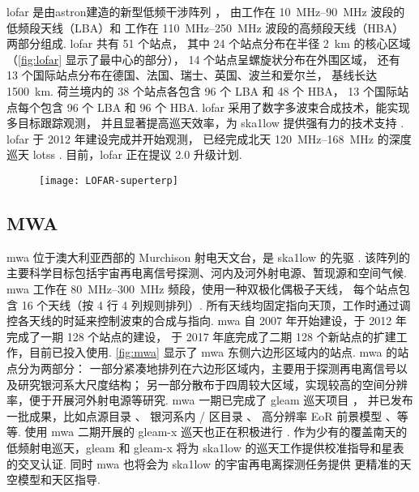 \acf{lofar} 是由\ac{astron}建造的新型低频干涉阵列 \cite{vanHaarlem2013}，
由工作在 \SIrange{10}{90}{\MHz} 波段的低频段天线（LBA）和
工作在 \SIrange{110}{250}{\MHz} 波段的高频段天线（HBA）两部分组成.
\acs{lofar} 共有 51 个站点，
其中 24 个站点分布在半径 \SI{2}{\km} 的核心区域
（\autoref{fig:lofar} 显示了最中心的部分），
14 个站点呈螺旋状分布在外围区域，
还有 13 个国际站点分布在德国、法国、瑞士、英国、波兰和爱尔兰，
基线长达 \SI{1500}{\km}.
荷兰境内的 38 个站点各包含 96 个 LBA 和 48 个 HBA，
13 个国际站点每个包含 96 个 LBA 和 96 个 HBA.
\acs{lofar} 采用了数字多波束合成技术，能实现多目标跟踪观测，
并且显著提高巡天效率，为 \acs{ska1low} 提供强有力的技术支持
\cite{deVos2009,vanHaarlem2013,pizzo2018}.
\acs{lofar} 于 2012 年建设完成并开始观测，
已经完成北天 \SIrange{120}{168}{\MHz} 的深度巡天
\ac{lotss} \cite{shimwell2017,shimwell2019}.
目前，\acs{lofar} 正在提议 2.0 升级计划.

\begin{figure}
  \centering
  \texttt{[image: LOFAR-superterp]}
  \label{fig:lofar}
\end{figure}

\subsection{MWA}

\acf{mwa} 位于澳大利亚西部的 Murchison 射电天文台，是 \acs{ska1low} 的先驱
\cite{lonsdale2009,bowman2013,tingay2013,wayth2018}.
该阵列的主要科学目标包括宇宙再电离信号探测、河内及河外射电源、暂现源和空间气候.
\acs{mwa} 工作在 \SIrange{80}{300}{\MHz} 频段，使用一种双极化偶极子天线，
每个站点包含 16 个天线（按 4 行 4 列规则排列）.
所有天线均固定指向天顶，工作时通过调控各天线的时延来控制波束的合成与指向.
\acs{mwa} 自 2007 年开始建设，于 2012 年完成了一期 128 个站点的建设，
于 2017 年底完成了二期 128 个新站点的扩建工作\cite{wayth2018}，目前已投入使用.
\autoref{fig:mwa} 显示了 \acs{mwa} 东侧六边形区域内的站点.
\acs{mwa} 的站点分为两部分：
一部分紧凑地排列在六边形区域内，主要用于探测再电离信号以及研究银河系大尺度结构；
另一部分散布于四周较大区域，实现较高的空间分辨率，便于开展河外射电源等研究.
\acs{mwa} 一期已完成了 \ac{gleam} 巡天项目 \cite{wayth2015}，
并已发布一批成果，比如点源目录 \cite{hurleyWalker2017}、
银河系内 \Hii/ 区目录 \cite{su2018}、
高分辨率 EoR 前景模型 \cite{procopio2017}、等等.
使用 \acs{mwa} 二期开展的 \ac{gleam-x} 巡天也正在积极进行 \cite{hurleyWalker2017prop}.
作为少有的覆盖南天的低频射电巡天，\acs{gleam} 和 \acs{gleam-x}
将为 \acs{ska1low} 的巡天工作提供校准指导和星表的交叉认证.
同时 \acs{mwa} 也将会为 \acs{ska1low} 的宇宙再电离探测任务提供
更精准的天空模型和天区指导.


